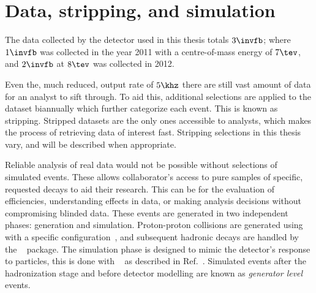 \section{Data, stripping, and simulation}

The data collected by the \lhcb detector used in this thesis totals $3\invfb$; where $1\invfb$ was
collected in the year 2011 with a centre-of-mass energy of $7\tev$, and $2\invfb$ at $8\tev$ was
collected in 2012.

Even the, much reduced, \hlttwo output rate of $5\khz$ there are still vast amount of data for an
analyst to sift through.
To aid this, additional selections are applied to the dataset biannually which further categorize
each event.
This is known as stripping.
Stripped datasets are the only ones accessible to analysts, which makes the process of retrieving
data of interest fast.
Stripping selections in this thesis vary, and will be described when appropriate.


Reliable analysis of real data would not be possible without selections of simulated events.
These allows collaborator's access to pure samples of specific, requested decays to aid their
research.
This can be for the evaluation of efficiencies, understanding effects in data, or making analysis
decisions without compromising blinded data.
These events are generated in two independent phases: generation and simulation.
Proton-proton collisions are generated using \pythia~\cite{Sjostrand:2006za,*Sjostrand:2007gs}
with a specific \lhcb configuration~\cite{LHCb-PROC-2010-056},
and subsequent hadronic decays are handled by the \evtgen~\cite{Lange:2001uf} package.
The simulation phase is designed to mimic the \lhcb detector's response to particles, this is done
with \geant~\cite{Allison:2006ve,*Agostinelli:2002hh} as described in
Ref.~\cite{LHCb-PROC-2011-006}.
Simulated events after the hadronization stage and before detector modelling are known as
\emph{generator level} events.











